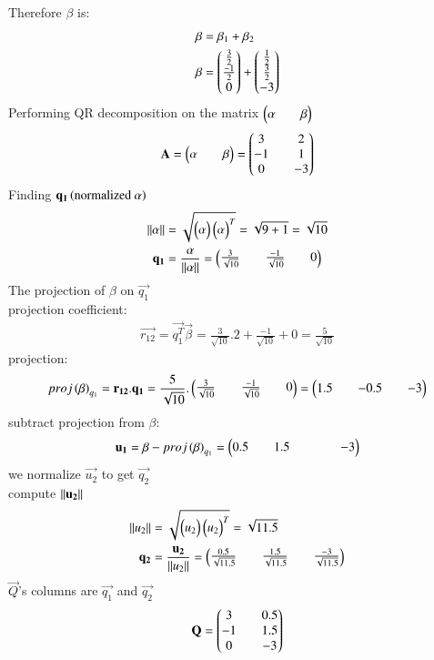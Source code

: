 \documentclass[journal]{IEEEtran}
\theoremstyle{remark}
\begin{document}
Therefore $\beta$ is:
\begin{align}
    \beta&=\beta_1+\beta_2\\
    \beta&=\begin{pmatrix}\frac{3}{2}\\ \frac{-1}{2}\\0\end{pmatrix}+\begin{pmatrix}\frac{1}{2}\\ \frac{3}{2}\\-3\end{pmatrix}
\end{align}
Performing QR decomposition on the matrix $\begin{pmatrix}\alpha&&\beta\end{pmatrix}$
\begin{align}
    \mathbf{A}=\begin{pmatrix}\alpha &&\beta\end{pmatrix}=\begin{pmatrix}3&& 2\\-1 && 1 \\ 0 && -3\end{pmatrix}
\end{align}
Finding $\mathbf{q_1}\left(\text{normalized}\  \alpha\right)$
\begin{align}
    \left\lVert\alpha\right\rVert&=\sqrt{\begin{pmatrix}\alpha\end{pmatrix}\begin{pmatrix}\alpha\end{pmatrix}^T}=\sqrt{9+1}=\sqrt{10}\\
    \mathbf{q_1}&=\frac{\mathbf{\alpha}}{\left\lVert\mathbf{\alpha}\right\rVert}=\begin{pmatrix}\frac{3}{\sqrt{10}}&&\frac{-1}{\sqrt{10}}&&0\end{pmatrix}
\end{align}
The projection of $\beta$ on $\vec{q_1}$\\
projection coefficient:
\begin{align}
    \vec{r_{12}}=\vec{q_1^T}\vec{\beta}=\frac{3}{\sqrt{10}}.2+\frac{-1}{\sqrt{10}}+0=\frac{5}{\sqrt{10}}
\end{align}
projection:
\begin{align}
    proj\left(\mathbf{\beta}\right)_{q_1}=\mathbf{r_{12}}.\mathbf{q_1}=\frac{5}{\sqrt{10}}.\begin{pmatrix}\frac{3}{\sqrt{10}}&&\frac{-1}{\sqrt{10}}&&0\end{pmatrix}=\begin{pmatrix}1.5 && -0.5 &&-3\end{pmatrix}
\end{align}
subtract projection from $\beta$:
\begin{align}
    \mathbf{u_1}=\beta-proj\left(\mathbf{\beta}\right)_{q_1}=\begin{pmatrix}0.5&&1.5&&&&-3\end{pmatrix}
\end{align}
we normalize $\vec{u_2}$ to get $\vec{q_2}$\\
compute $\left\lVert\mathbf{u_2}\right\rVert$
\begin{align}
    \left\lVert u_2\right\rVert&=\sqrt{\begin{pmatrix}u_2\end{pmatrix}\begin{pmatrix}u_2\end{pmatrix}^T}=\sqrt{11.5}\\
    \mathbf{q_2}&=\frac{\mathbf{u_2}}{\left\lVert u_2\right\rVert}=\begin{pmatrix}\frac{0.5}{\sqrt{11.5}}&& \frac{1.5}{\sqrt{11.5}}&&\frac{-3}{\sqrt{11.5}}\end{pmatrix}
\end{align}
$\vec{Q}$'s columns are $\vec{q_1}$ and $\vec{q_2}$
\begin{align}
    \mathbf{Q}=\begin{pmatrix}3 && 0.5 \\ -1 && 1.5 \\ 0 && -3\end{pmatrix}
\end{align}
\end{document}
